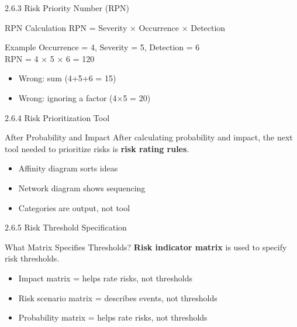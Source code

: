 \documentclass{beamer}
\begin{document}
	\begin{frame}{2.6.3 Risk Priority Number (RPN)}
		\begin{block}{RPN Calculation}
			RPN = Severity × Occurrence × Detection
		\end{block}
		\begin{exampleblock}{Example}
			Occurrence = 4, Severity = 5, Detection = 6 \\
			RPN = 4 × 5 × 6 = 120
		\end{exampleblock}
		\begin{itemize}
			\item Wrong: sum (4+5+6 = 15)
			\item Wrong: ignoring a factor (4×5 = 20)
		\end{itemize}
	\end{frame}
	
	\begin{frame}{2.6.4 Risk Prioritization Tool}
		\begin{block}{After Probability and Impact}
			After calculating probability and impact, the next tool needed to prioritize risks is \textbf{risk rating rules}.
		\end{block}
		\begin{itemize}
			\item Affinity diagram sorts ideas
			\item Network diagram shows sequencing
			\item Categories are output, not tool
		\end{itemize}
	\end{frame}
	
	\begin{frame}{2.6.5 Risk Threshold Specification}
		\begin{block}{What Matrix Specifies Thresholds?}
			\textbf{Risk indicator matrix} is used to specify risk thresholds.
		\end{block}
		\begin{itemize}
			\item Impact matrix = helps rate risks, not thresholds
			\item Risk scenario matrix = describes events, not thresholds
			\item Probability matrix = helps rate risks, not thresholds
		\end{itemize}
	\end{frame}
	
\end{document}
